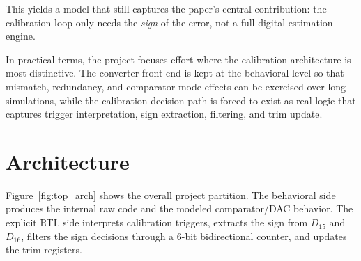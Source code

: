 \documentclass[11pt]{article}
\begin{document}
This yields a model that still captures the paper's \cite{ding2017} central contribution: the calibration loop only needs the \emph{sign} of the error, not a full digital estimation engine.

In practical terms, the project focuses effort where the calibration architecture is most distinctive. The converter front end is kept at the behavioral level so that mismatch, redundancy, and comparator-mode effects can be exercised over long simulations, while the calibration decision path is forced to exist as real logic that captures trigger interpretation, sign extraction, filtering, and trim update.

\section{Architecture}
Figure~\ref{fig:top_arch} shows the overall project partition. The behavioral side produces the internal raw code and the modeled comparator/DAC behavior. The explicit RTL side interprets calibration triggers, extracts the sign from $D_{15}$ and $D_{16}$, filters the sign decisions through a 6-bit bidirectional counter, and updates the trim registers.
\end{document}
